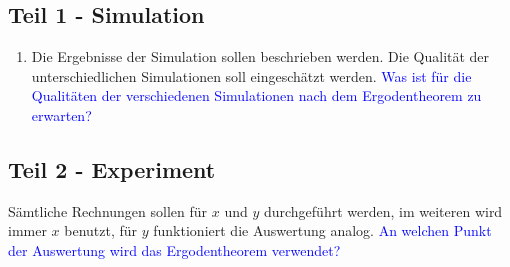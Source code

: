 \documentclass[a4paper, 12pt]{scrartcl}
\begin{document}
\subsection*{Teil 1 - Simulation}

\begin{enumerate}

  \item Die Ergebnisse der Simulation sollen beschrieben werden. Die Qualität der unterschiedlichen Simulationen soll eingeschätzt werden.
  \textcolor{blue}{Was ist für die Qualitäten der verschiedenen Simulationen nach dem Ergodentheorem zu erwarten?}

\end{enumerate}

\subsection*{Teil 2 - Experiment}

Sämtliche Rechnungen sollen für $x$ und $y$ durchgeführt werden, im weiteren wird immer $x$ benutzt, für $y$ funktioniert die Auswertung analog.
\textcolor{blue}{An welchen Punkt der Auswertung wird das Ergodentheorem verwendet?}
\end{document}
